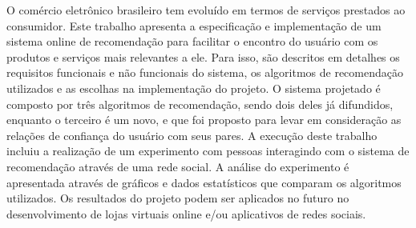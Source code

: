 O comércio eletrônico brasileiro tem evoluído em termos de serviços prestados ao consumidor. Este trabalho apresenta a especificação e implementação de um sistema online de recomendação para facilitar o encontro do usuário com os produtos e serviços mais relevantes a ele. Para isso, são descritos em detalhes os requisitos funcionais e não funcionais do sistema, os algoritmos de recomendação utilizados e as escolhas na implementação do projeto. 
O sistema projetado é composto por três algoritmos de recomendação, sendo dois deles já difundidos, enquanto o terceiro é um novo, e que foi proposto para levar em consideração as relações de confiança do usuário com seus pares. 
A execução deste trabalho incluiu a realização de um experimento com pessoas interagindo com o sistema de recomendação através de uma rede social. A análise do experimento é apresentada através de gráficos e dados estatísticos que comparam os algoritmos utilizados. 
Os resultados do projeto podem ser aplicados no futuro no desenvolvimento de lojas virtuais online e/ou aplicativos de redes sociais.